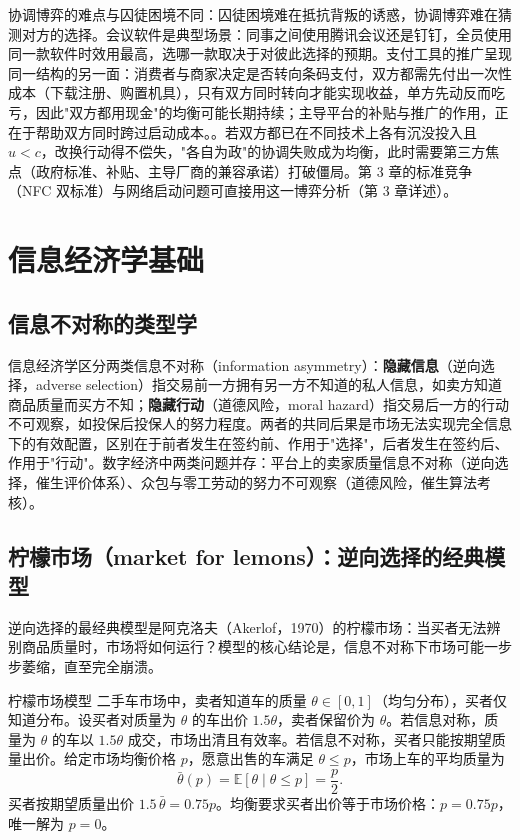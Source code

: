 协调博弈的难点与囚徒困境不同：囚徒困境难在抵抗背叛的诱惑，协调博弈难在猜测对方的选择。会议软件是典型场景：同事之间使用腾讯会议还是钉钉，全员使用同一款软件时效用最高，选哪一款取决于对彼此选择的预期。支付工具的推广呈现同一结构的另一面：消费者与商家决定是否转向条码支付，双方都需先付出一次性成本（下载注册、购置机具），只有双方同时转向才能实现收益，单方先动反而吃亏，因此"双方都用现金"的均衡可能长期持续；主导平台的补贴与推广的作用，正在于帮助双方同时跨过启动成本。。若双方都已在不同技术上各有沉没投入且 $u < c$，改换行动得不偿失，"各自为政"的协调失败成为均衡，此时需要第三方焦点（政府标准、补贴、主导厂商的兼容承诺）打破僵局。第 3 章的标准竞争（NFC 双标准）与网络启动问题可直接用这一博弈分析（第 3 章详述）。


\section{信息经济学基础}

\subsection{信息不对称的类型学}

信息经济学区分两类信息不对称（information asymmetry）：\textbf{隐藏信息}（逆向选择，adverse selection）指交易前一方拥有另一方不知道的私人信息，如卖方知道商品质量而买方不知；\textbf{隐藏行动}（道德风险，moral hazard）指交易后一方的行动不可观察，如投保后投保人的努力程度。两者的共同后果是市场无法实现完全信息下的有效配置，区别在于前者发生在签约前、作用于"选择"，后者发生在签约后、作用于"行动"。数字经济中两类问题并存：平台上的卖家质量信息不对称（逆向选择，催生评价体系）、众包与零工劳动的努力不可观察（道德风险，催生算法考核）。

\subsection{柠檬市场（market for lemons）：逆向选择的经典模型}

逆向选择的最经典模型是阿克洛夫（Akerlof，1970）的柠檬市场：当买者无法辨别商品质量时，市场将如何运行？模型的核心结论是，信息不对称下市场可能一步步萎缩，直至完全崩溃。

\begin{derivation}{柠檬市场模型}{}
二手车市场中，卖者知道车的质量 $\theta \in [0,1]$（均匀分布），买者仅知道分布。设买者对质量为 $\theta$ 的车出价 $1.5\theta$，卖者保留价为 $\theta$。若信息对称，质量为 $\theta$ 的车以 $1.5\theta$ 成交，市场出清且有效率。若信息不对称，买者只能按期望质量出价。给定市场均衡价格 $p$，愿意出售的车满足 $\theta \leq p$，市场上车的平均质量为
\[
\bar\theta(p) = \mathbb{E}[\theta \mid \theta \leq p] = \frac{p}{2}.
\]
买者按期望质量出价 $1.5\,\bar\theta = 0.75p$。均衡要求买者出价等于市场价格：$p = 0.75p$，唯一解为 $p = 0$。
\end{derivation}

